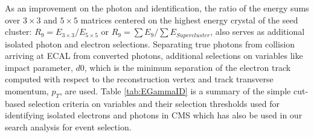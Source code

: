 As an improvement on the photon and identification, the ratio of the energy sums over $3\times3$ and $5\times5$ matrices centered on the highest energy  crystal of the seed cluster: $R_{9} = E_{3\times3}/E_{5\times 5}$ or $R_{9} = \sum E_{9}/\sum E_{Supercluster}$, also serves as additional isolated photon and electron selections. Separating true photons from collision arriving at ECAL from converted photons,  additional selections on variables like impact parameter,  $d0$, which is the minimum separation of the electron track computed with respect to the  reconstruction vertex and track transverse momentum, $p_{T}$, are used.
 Table \ref{tab:EGammaID} is a summary of the simple cut-based selection criteria on variables and their selection thresholds used for identifying isolated electrons and photons in CMS which has also be used in our search analysis for event selection.

